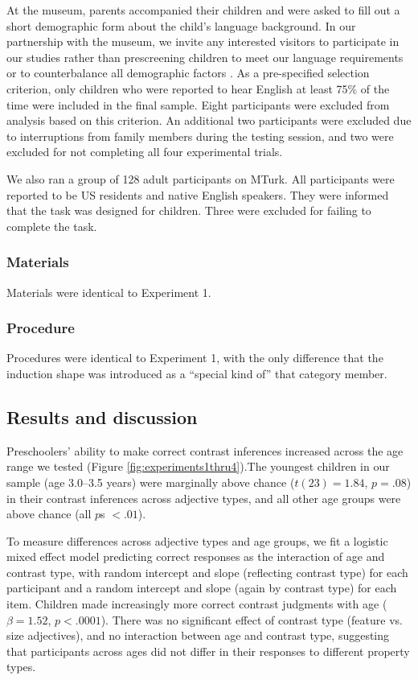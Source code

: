 \documentclass[man]{apa2}
\begin{document}
At the museum, parents accompanied their children and were asked to fill out a short demographic form about the child's language background. In our partnership with the museum, we invite any interested visitors to participate in our studies rather than prescreening children to meet our language requirements or to counterbalance all demographic factors \cite{callanan2012}. As a pre-specified selection criterion, only children who were reported to hear English at least 75\% of the time were included in the final sample.  Eight participants were excluded from analysis based on this criterion. An additional two participants were excluded due to interruptions from family members during the testing session, and two were excluded for not completing all four experimental trials. 

We also ran a group of 128 adult participants on MTurk.  All participants were reported to be US residents and native English speakers.  They were informed that the task was designed for children. Three were excluded for failing to complete the task. 

\subsubsection{Materials}

Materials were identical to Experiment 1.

\subsubsection{Procedure}

Procedures were identical to Experiment 1, with the only difference that the induction shape was introduced as a ``special kind of'' that category member.

\subsection{Results and discussion}


Preschoolers' ability to make correct contrast inferences increased across the age range we tested (Figure \ref{fig:experiments1thru4}).The youngest children in our sample (age 3.0--3.5 years) were marginally above chance ($t(23) = 1.84$, $p = .08$) in their contrast inferences across adjective types, and all other age groups were above chance (all $p$s $< .01$).

To measure differences across adjective types and age groups, we fit a logistic mixed effect model predicting correct responses as the interaction of age and contrast type, with random intercept and slope (reflecting contrast type) for each participant and a random intercept and slope (again by contrast type) for each item. Children made increasingly more correct contrast judgments with age ($\beta = 1.52$, $p < .0001$). There was no significant effect of contrast type (feature vs. size adjectives), and no interaction between age and contrast type, suggesting that participants across ages did not differ in their responses to different property types.  
\end{document}

